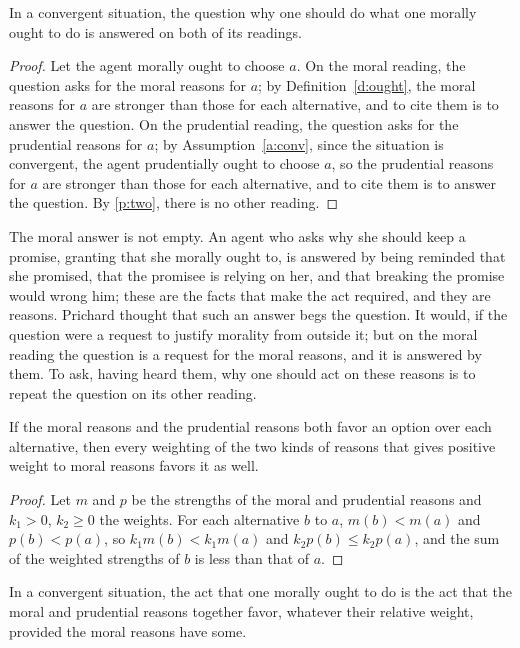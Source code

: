 \documentclass{situationist-preprint}
\begin{document}
\begin{theorem}\label{t:main}
In a convergent situation, the question why one should do what one morally ought to do is answered on both of its readings.
\end{theorem}

\begin{proof}
Let the agent morally ought to choose $a$. On the moral reading, the question asks for the moral reasons for $a$; by Definition~\ref{d:ought}, the moral reasons for $a$ are stronger than those for each alternative, and to cite them is to answer the question. On the prudential reading, the question asks for the prudential reasons for $a$; by Assumption~\ref{a:conv}, since the situation is convergent, the agent prudentially ought to choose $a$, so the prudential reasons for $a$ are stronger than those for each alternative, and to cite them is to answer the question. By \ref{p:two}, there is no other reading.
\end{proof}

The moral answer is not empty. An agent who asks why she should keep a promise, granting that she morally ought to, is answered by being reminded that she promised, that the promisee is relying on her, and that breaking the promise would wrong him; these are the facts that make the act required, and they are reasons. Prichard thought that such an answer begs the question. It would, if the question were a request to justify morality from outside it; but on the moral reading the question is a request for the moral reasons, and it is answered by them. To ask, having heard them, why one should act on these reasons is to repeat the question on its other reading.

\begin{lemma}[Dominance]\label{l:dom}
If the moral reasons and the prudential reasons both favor an option over each alternative, then every weighting of the two kinds of reasons that gives positive weight to moral reasons favors it as well.
\end{lemma}

\begin{proof}
Let $m$ and $p$ be the strengths of the moral and prudential reasons and $k_1>0$, $k_2\ge 0$ the weights. For each alternative $b$ to $a$, $m(b)<m(a)$ and $p(b)<p(a)$, so $k_1 m(b)<k_1 m(a)$ and $k_2 p(b)\le k_2 p(a)$, and the sum of the weighted strengths of $b$ is less than that of $a$.
\end{proof}

\begin{corollary}\label{c:atc}
In a convergent situation, the act that one morally ought to do is the act that the moral and prudential reasons together favor, whatever their relative weight, provided the moral reasons have some.
\end{corollary}
\end{document}
